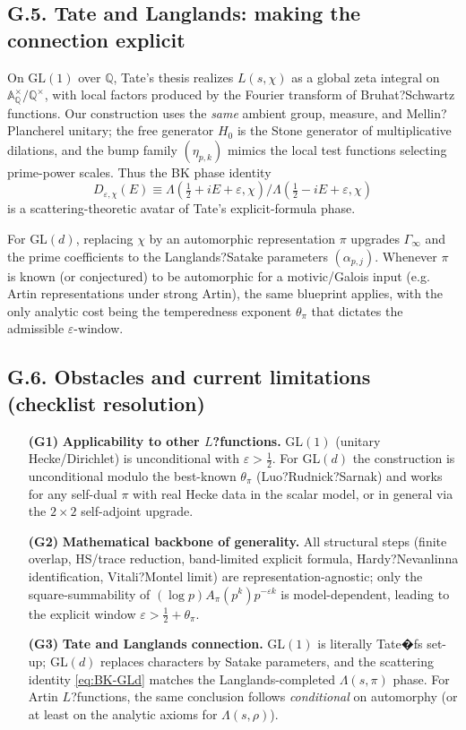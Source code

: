﻿\documentclass[12pt,a4paper]{article}
\theoremstyle{definition}
\theoremstyle{remark}
\begin{document}
\subsection{G.5. Tate and Langlands: making the connection explicit}

On $\mathrm{GL}(1)$ over $\mathbb Q$, Tate's thesis realizes $L(s,\chi)$ as a global zeta integral on $\mathbb A_\mathbb Q^\times/\mathbb Q^\times$, with local factors produced by the Fourier transform of Bruhat?Schwartz functions. 
Our construction uses the \emph{same} ambient group, measure, and Mellin?Plancherel unitary; the free generator $H_0$ is the Stone generator of multiplicative dilations, and the bump family $(\eta_{p,k})$ mimics the local test functions selecting prime-power scales. 
Thus the BK phase identity 
\begin{equation*}
D_{\varepsilon,\chi}(E)
\equiv
\Lambda(\tfrac12+iE+\varepsilon,\chi)\big/\Lambda(\tfrac12-iE+\varepsilon,\chi)
\end{equation*}
is a scattering-theoretic avatar of Tate's explicit-formula phase.

For GL$(d)$, replacing $\chi$ by an automorphic representation $\pi$ upgrades $\Gamma_\infty$ and the prime coefficients to the Langlands?Satake parameters $(\alpha_{p,j})$. 
Whenever $\pi$ is known (or conjectured) to be automorphic for a motivic/Galois input (e.g.
Artin representations under strong Artin), the same blueprint applies, with the only analytic cost being the temperedness exponent $\theta_\pi$ that dictates the admissible $\varepsilon$-window.

\subsection{G.6. Obstacles and current limitations (checklist resolution)}

\begin{itemize}
\item[\textbf{(G1)}]
\textbf{Applicability to other $L$?functions.} 
GL$(1)$ (unitary Hecke/Dirichlet) is unconditional with $\varepsilon>\tfrac12$. 
For GL$(d)$ the construction is unconditional modulo the best-known $\theta_\pi$ (Luo?Rudnick?Sarnak) and works for any self-dual $\pi$ with real Hecke data in the scalar model, or in general via the $2\times2$ self-adjoint upgrade.
\item[\textbf{(G2)}]
\textbf{Mathematical backbone of generality.} 
All structural steps (finite overlap, HS/trace reduction, band-limited explicit formula, Hardy?Nevanlinna identification, Vitali?Montel limit) are representation-agnostic; only the square-summability of $(\log p)A_\pi(p^k)p^{-\varepsilon k}$ is model-dependent, leading to the explicit window $\varepsilon>\tfrac12+\theta_\pi$.
\item[\textbf{(G3)}]
\textbf{Tate and Langlands connection.} 
GL$(1)$ is literally Tate�fs set-up; GL$(d)$ replaces characters by Satake parameters, and the scattering identity 
\ref{eq:BK-GLd} matches the Langlands-completed $\Lambda(s,\pi)$ phase. 
For Artin $L$?functions, the same conclusion follows \emph{conditional} on automorphy (or at least on the analytic axioms for $\Lambda(s,\rho)$).
\end{itemize}
\end{document}
